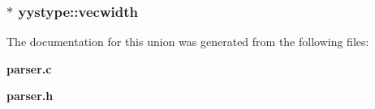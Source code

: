 \subsubsection{$\ast$ yystype::vecwidth}\label{unionyystype_m8}




The documentation for this union was generated from the following files:\begin{CompactItemize}
\item 
{\bf parser.c}\item 
{\bf parser.h}\end{CompactItemize}
